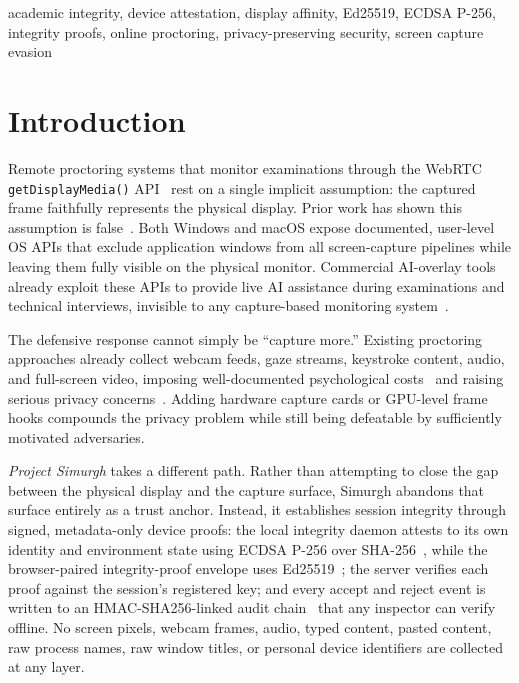 \documentclass[conference]{IEEEtran}
\begin{document}
\begin{IEEEkeywords}
academic integrity, device attestation, display affinity, Ed25519, ECDSA P-256, integrity proofs, online proctoring, privacy-preserving security, screen capture evasion
\end{IEEEkeywords}

\section{Introduction}

Remote proctoring systems that monitor examinations through the WebRTC \texttt{getDisplayMedia()} API~\cite{bruaroey2025screen} rest on a single implicit assumption: the captured frame faithfully represents the physical display. Prior work has shown this assumption is false~\cite{abedini2026invisible}. Both Windows and macOS expose documented, user-level OS APIs that exclude application windows from all screen-capture pipelines while leaving them fully visible on the physical monitor. Commercial AI-overlay tools already exploit these APIs to provide live AI assistance during examinations and technical interviews, invisible to any capture-based monitoring system~\cite{cluely2025,interviewcoder2026,fabrichq2026cheating}.

The defensive response cannot simply be ``capture more.'' Existing proctoring approaches already collect webcam feeds, gaze streams, keystroke content, audio, and full-screen video, imposing well-documented psychological costs~\cite{conijn2022fear} and raising serious privacy concerns~\cite{paris2021sins,mukherjee2024balancing}. Adding hardware capture cards or GPU-level frame hooks compounds the privacy problem while still being defeatable by sufficiently motivated adversaries.

\textit{Project Simurgh} takes a different path. Rather than attempting to close the gap between the physical display and the capture surface, Simurgh abandons that surface entirely as a trust anchor. Instead, it establishes session integrity through signed, metadata-only device proofs: the local integrity daemon attests to its own identity and environment state using ECDSA P-256 over SHA-256~\cite{fips1865}, while the browser-paired integrity-proof envelope uses Ed25519~\cite{rfc8032}; the server verifies each proof against the session's registered key; and every accept and reject event is written to an HMAC-SHA256-linked audit chain~\cite{rfc2104} that any inspector can verify offline. No screen pixels, webcam frames, audio, typed content, pasted content, raw process names, raw window titles, or personal device identifiers are collected at any layer.
\end{document}
